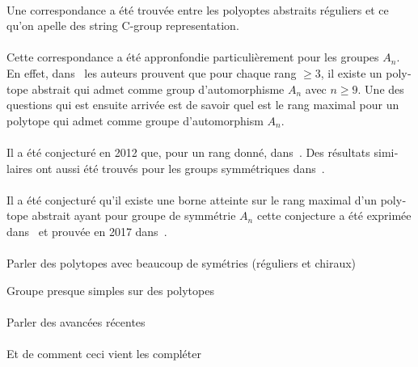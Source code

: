 \begin{otherlanguage}{french}
\paragraph{}
Une correspondance a été trouvée entre les polyoptes abstraits réguliers et ce qu'on apelle des string C-group representation.

\paragraph{}
Cette correspondance a été appronfondie particulièrement pour les groupes $A_n$. En effet, dans~\cite{} les auteurs prouvent que pour chaque rang $\ge 3$, il existe un polytope abstrait qui admet comme group d'automorphisme $A_n$ avec $n \ge 9$. Une des questions qui est ensuite arrivée est de savoir quel est le rang maximal pour un polytope qui admet comme groupe d'automorphism $A_n$.

\paragraph{}
Il a été conjecturé en 2012 que, pour un rang donné, dans~\cite{highRankAlternating}. Des résultats similaires ont aussi été trouvés pour les groups symmétriques dans~\cite{highRankSym}.

\paragraph{}
Il a été conjecturé qu'il existe une borne atteinte sur le rang maximal d'un polytope abstrait ayant pour groupe de symmétrie $A_{n}$ cette conjecture a été exprimée dans~\cite{A12PolytopesRank} et prouvée en 2017 dans~\cite{highestRankOfAn}.

\paragraph{}
Parler des polytopes avec beaucoup de symétries (réguliers et chiraux)

Groupe presque simples sur des polytopes

\paragraph{}
Parler des avancées récentes

\paragraph{}
Et de comment ceci vient les compléter


\end{otherlanguage}
